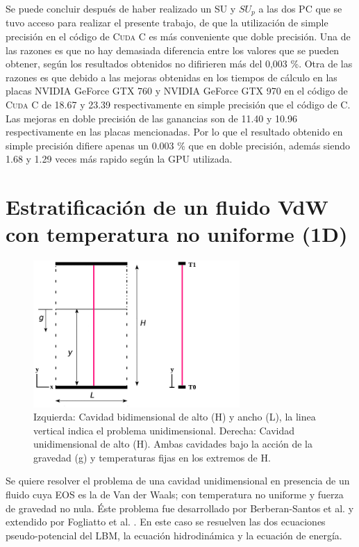 Se puede concluir después de haber realizado un SU y $SU_p$ a las dos PC que se tuvo acceso para realizar el presente trabajo, de que la utilización de simple precisión en el código de \textsc{Cuda C} es más conveniente que doble precisión. Una de las razones es que no hay demasiada diferencia entre los valores que se pueden obtener, según los resultados obtenidos no difirieren más del 0,003 \%. Otra de las razones es que debido a las mejoras obtenidas en los tiempos de cálculo en las placas NVIDIA GeForce GTX 760 y NVIDIA GeForce GTX 970 en el código de \textsc{Cuda C} de 18.67 y 23.39 respectivamente en simple precisión que el código de \textsc{C}. Las mejoras en doble precisión de las ganancias son de 11.40 y 10.96 respectivamente en las placas mencionadas. Por lo que el resultado obtenido en simple precisión difiere apenas un 0.003 \% que en doble precisión, además siendo 1.68 y 1.29 veces más rapido según la GPU utilizada.

\newpage

\section{Estratificación de un fluido VdW con temperatura no uniforme (1D)}

\begin{figure}[htbp]
	\centering
	\includegraphics[width=0.7\textwidth]{figs/cap4/esquema_problema_VdW}
	\caption{Izquierda: Cavidad bidimensional de alto (H) y ancho (L), la linea vertical indica el problema unidimensional. Derecha: Cavidad unidimensional de alto (H). Ambas cavidades bajo la acción de la gravedad (g) y temperaturas fijas en los extremos de H.} 
	\label{fig:esquema_VdW}	
\end{figure}

Se quiere resolver el problema de una cavidad unidimensional en presencia de un fluido cuya EOS es la de Van der Waals; con temperatura  no uniforme y fuerza de gravedad no nula. Éste problema fue desarrollado por Berberan-Santos et al. \cite{berberan2002liquid} y extendido por Fogliatto et al. \cite{fogliatto2019simulation}. En este caso se resuelven las dos ecuaciones pseudo-potencial del LBM, la ecuación hidrodinámica y la ecuación de energía.

